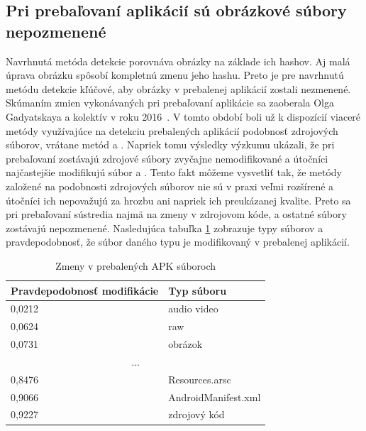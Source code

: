 \subsection*{Pri prebaľovaní aplikácií sú obrázkové súbory nepozmenené}
Navrhnutá metóda detekcie porovnáva obrázky na základe ich hashov. Aj malá úprava obrázku spôsobí kompletnú zmenu jeho hashu. Preto je pre navrhnutú metódu detekcie kľúčové, aby obrázky v prebalenej aplikácií zostali nezmenené. Skúmaním zmien vykonávaných pri prebaľovaní aplikácie sa zaoberala Olga Gadyatskaya a kolektív v roku 2016~\cite{Gadyatskaya2016}. V tomto období boli už k dispozícií viaceré metódy využívajúce na detekciu prebalených aplikácií podobnosť zdrojových súborov, vrátane metód  a . Napriek tomu výsledky výzkumu ukázali, že pri prebaľovaní zostávajú zdrojové súbory zvyčajne nemodifikované a útočníci najčastejšie modifikujú súbor  a . Tento fakt môžeme vysvetliť tak, že metódy založené na podobnosti zdrojových súborov nie sú v praxi veľmi rozšírené a útočníci ich nepovažujú za hrozbu ani napriek ich preukázanej kvalite. Preto sa pri prebaľovaní sústredia najmä na zmeny v zdrojovom kóde, a ostatné súbory zostávajú nepozmenené. Nasledujúca tabuľka \ref{repacakged-changes} zobrazuje typy súborov a pravdepodobnosť, že súbor daného typu je modifikovaný v prebalenej aplikácií.

\begin{table}[]
\centering
\caption{Zmeny v prebalených APK súboroch}
\label{repacakged-changes}
\begin{tabular}{|l|l|}
\hline
\textbf{Pravdepodobnosť modifikácie} & \textbf{Typ súboru}          \\ \hline
0,0212                                      & audio video         \\
0,0624                                      & raw                 \\
0,0731                                      & obrázok             \\
\multicolumn{2}{|c|}{...} \\
0,8476                                      & Resources.arsc      \\
0,9066                                      & AndroidManifest.xml \\
0,9227                                      & zdrojový kód        \\
\hline
\end{tabular}
\end{table}

